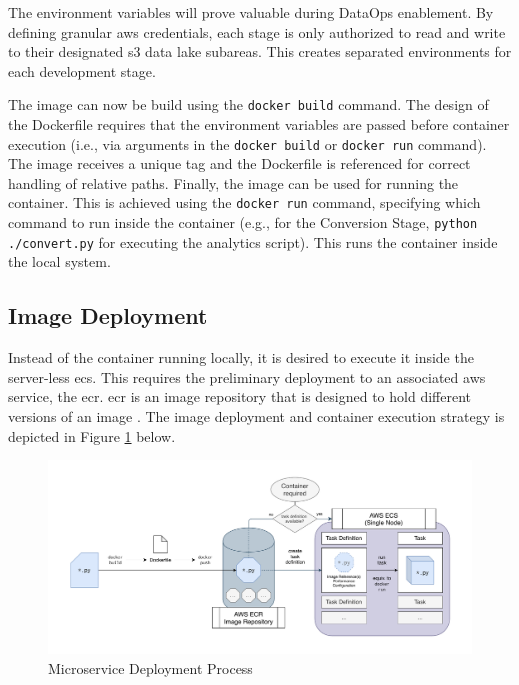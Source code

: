 The environment variables will prove valuable during DataOps enablement. By defining granular \ac{aws} credentials, each stage is only authorized to read and write to their designated \ac{s3} data lake subareas. This creates separated environments for each development stage.

The image can now be build using the \texttt{docker build} command. The design of the Dockerfile requires that the environment variables are passed before container execution (i.e., via arguments in the \texttt{docker build} or \texttt{docker run} command). The image receives a unique tag and the Dockerfile is referenced for correct handling of relative paths. Finally, the image can be used for running the container. This is achieved using the \texttt{docker run} command, specifying which command to run inside the container (e.g., for the Conversion Stage, \texttt{python ./convert.py} for executing the analytics script). This runs the container inside the local system.

\subsection{Image Deployment}
Instead of the container running locally, it is desired to execute it inside the server-less \ac{ecs}. This requires the preliminary deployment to an associated \ac{aws} service, the \ac{ecr}. \ac{ecr} is an image repository that is designed to hold different versions of an image \cite{ecr}. The image deployment and container execution strategy is depicted in Figure \ref{fig:5-container-deployment} below.

\begin{figure}[h!]
	\centering
	\includegraphics[width=\linewidth]{main-matter/img/5-container-deployment.pdf}
	\caption{Microservice Deployment Process}
	\label{fig:5-container-deployment}	
\end{figure}


